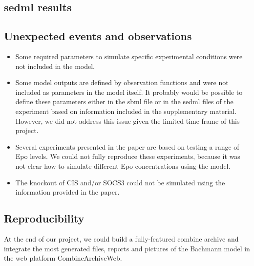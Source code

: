 \subsection*{\acl{sedml} results}

\subsection*{Unexpected events and observations}
\begin{itemize}
    \item Some required parameters to simulate specific experimental conditions were not included in the model.
\item Some model outputs are defined by observation functions and were not included as parameters in the model itself. It probably would be possible to define these parameters either in the \ac{sbml} file or in the \ac{sedml} files of the experiment based on information included in the supplementary material. However, we did not address this issue given the limited time frame of this project.
\item Several experiments presented in the paper are based on testing a range of Epo levels. We could not fully reproduce these experiments, because it was not clear how to simulate different Epo concentrations using the model.
\item The knockout of CIS and/or SOCS3 could not be simulated using the information provided in the paper.
\end{itemize}

\subsection*{Reproducibility}
At the end of our project, we could build a fully-featured \ac{combine} archive and integrate the most generated files, reports and pictures of the Bachmann model in the web platform CombineArchiveWeb.